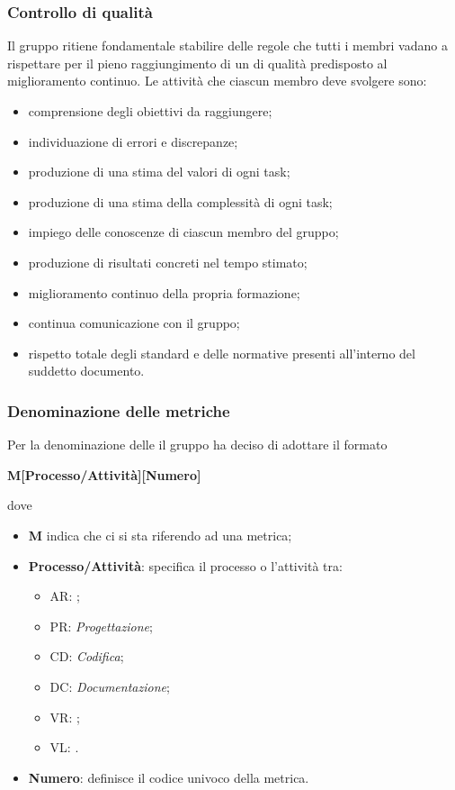 {{\subsubsection{Controllo di qualità}
Il gruppo \textit{\Gruppo{}} ritiene fondamentale stabilire delle regole che tutti i membri vadano a rispettare per il pieno raggiungimento di un  di qualità predisposto al miglioramento continuo.
Le attività che ciascun membro deve svolgere sono:
\begin{itemize}
	\item comprensione degli obiettivi da raggiungere;
	\item individuazione di errori e discrepanze;
	\item produzione di una stima del valori di ogni task;
	\item produzione di una stima della complessità di ogni task;
	\item impiego delle conoscenze di ciascun membro del gruppo;
	\item produzione di risultati concreti nel tempo stimato;
	\item miglioramento continuo della propria formazione;
	\item continua comunicazione con il gruppo;
	\item rispetto totale degli standard e delle normative presenti all'interno del suddetto documento.
\end{itemize} 
\subsubsection{Denominazione delle metriche}
Per la denominazione delle  il gruppo ha deciso di adottare il formato\newline \centerline{\textbf{M[Processo/Attività][Numero]}}\newline
dove
\begin{itemize}
	\item \textbf{M} indica che ci si sta riferendo ad una metrica;
	\item \textbf{Processo/Attività}: specifica il processo o l'attività tra:
	\begin{itemize}
		\item AR: \AdR{};
		\item PR: \emph{Progettazione};
		\item CD: \emph{Codifica};
		\item DC: \emph{Documentazione};
		\item VR: \emph{};
		\item VL: \emph{}.
	\end{itemize}
	\item \textbf{Numero}: definisce il codice univoco della metrica.
\end{itemize}
}}
